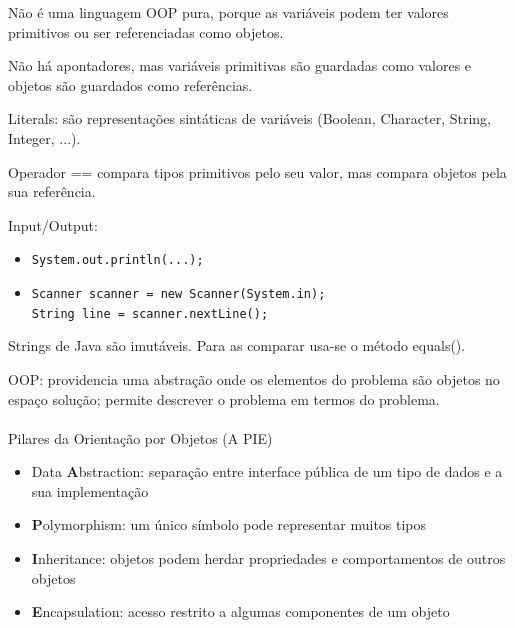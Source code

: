 \documentclass[../resumosLPOO.tex]{subfiles}
\begin{document}
 

Não é uma linguagem OOP pura, porque as variáveis podem ter valores primitivos ou ser referenciadas como objetos.

Não há apontadores, mas variáveis primitivas são guardadas como valores e objetos são guardados como referências.

Literals: são representações sintáticas de variáveis (Boolean, Character, String, Integer, ...).

Operador == compara tipos primitivos pelo seu valor, mas compara objetos pela sua referência.

Input/Output:
\begin{itemize}
    \item \lstinline{System.out.println(...);}
    \item \lstinline{Scanner scanner = new Scanner(System.in);} \\ \lstinline{String line = scanner.nextLine();} 
\end{itemize}

Strings de Java são imutáveis. Para as comparar usa-se o método equals().

OOP: providencia uma abstração onde os elementos do problema são objetos no espaço solução; permite descrever o problema em termos do problema.

\paragraph{}

Pilares da Orientação por Objetos (A PIE)
\begin{itemize}
    \item Data \textbf{A}bstraction: separação entre interface pública de um tipo de dados e a sua implementação
    \item \textbf{P}olymorphism: um único símbolo pode representar muitos tipos
    \item \textbf{I}nheritance: objetos podem herdar propriedades e comportamentos de outros objetos
    \item \textbf{E}ncapsulation: acesso restrito a algumas componentes de um objeto
\end{itemize}

\paragraph{}
\end{document}
